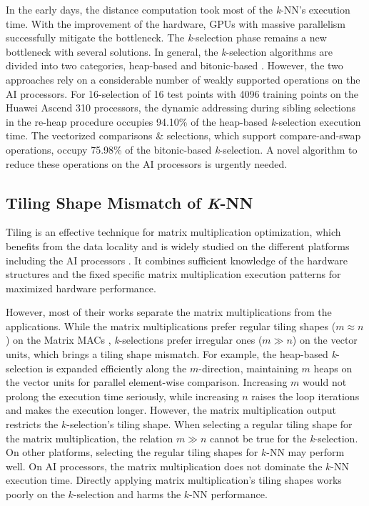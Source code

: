 In the early days, the distance computation took most of the \textit{k}-NN's execution time. With the improvement of the hardware, GPUs with massive parallelism successfully mitigate the bottleneck. The \textit{k}-selection phase remains a new bottleneck with several solutions. In general, the \textit{k}-selection algorithms are divided into two categories, heap-based \cite{DBLP:conf/medi/VelentzasVC21, DBLP:conf/sigmod/ShanbhagPM18, DBLP:conf/ccgrid/KatoH10, DBLP:journals/concurrency/KatoH12, DBLP:conf/icip/GarciaDNB10, DBLP:conf/egh/LiSPAOA12} and bitonic-based \cite{DBLP:conf/sigmod/ShanbhagPM18, DBLP:journals/tbd/JohnsonDJ21, DBLP:conf/ipps/Tang0EMG15}. However, the two approaches rely on a considerable number of weakly supported operations on the AI processors. For 16-selection of 16 test points with 4096 training points on the Huawei Ascend 310 processors, the dynamic addressing during sibling selections in the re-heap procedure occupies 94.10\% of the heap-based \textit{k}-selection execution time. The vectorized comparisons \& selections, which support compare-and-swap operations, occupy 75.98\% of the bitonic-based \textit{k}-selection. A novel algorithm to reduce these operations on the AI processors is urgently needed.

\subsection{Tiling Shape Mismatch of \textit{K}-NN \label{sec:tiling}}

Tiling is an effective technique for matrix multiplication optimization, which benefits from the data locality and is widely studied on the different platforms including the AI processors \cite{DBLP:conf/ppopp/Li0YJL19, DBLP:conf/ppopp/NiuLJS0022, DBLP:conf/ppopp/HongSNSS19, DBLP:conf/ipps/00020C20, DBLP:conf/ppopp/FengWCZ0D21, DBLP:conf/micro/ZhaoD20}. It combines sufficient knowledge of the hardware structures and the fixed specific matrix multiplication execution patterns for maximized hardware performance.

However, most of their works separate the matrix multiplications from the applications. While the matrix multiplications prefer regular tiling shapes ($m \approx n$) on the Matrix MACs \cite{DBLP:conf/ipps/00020C20}, \textit{k}-selections prefer irregular ones ($m \gg n$) on the vector units, which brings a tiling shape mismatch. For example, the heap-based \textit{k}-selection is expanded efficiently along the $m$-direction, maintaining $m$ heaps on the vector units for parallel element-wise comparison. Increasing $m$ would not prolong the execution time seriously, while increasing $n$ raises the loop iterations and makes the execution longer. However, the matrix multiplication output restricts the $k$-selection's tiling shape. When selecting a regular tiling shape for the matrix multiplication, the relation $m \gg n$ cannot be true for the \textit{k}-selection. On other platforms, selecting the regular tiling shapes for $k$-NN may perform well. On AI processors, the matrix multiplication does not dominate the $k$-NN execution time. Directly applying matrix multiplication's tiling shapes works poorly on the $k$-selection and harms the $k$-NN performance.


